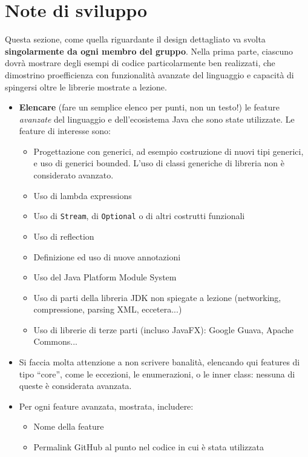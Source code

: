 \documentclass[a4paper,12pt]{report}
\begin{document}
\section{Note di sviluppo}

Questa sezione, come quella riguardante il design dettagliato va svolta \textbf{singolarmente da ogni membro del gruppo}.
%
Nella prima parte, ciascuno dovrà mostrare degli esempi di codice particolarmente ben realizzati,
che dimostrino proefficienza con funzionalità avanzate del linguaggio e capacità di spingersi oltre le librerie mostrate a lezione.

\begin{itemize}
	\item \textbf{Elencare} (fare un semplice elenco per punti, non un testo!) le feature \textit{avanzate} del linguaggio e dell'ecosistema Java che sono state
	      utilizzate. Le feature di interesse sono:
	      \begin{itemize}
		      \item Progettazione con generici, ad esempio costruzione di nuovi tipi generici, e uso di generici bounded.
		            L'uso di classi generiche di libreria non è considerato avanzato.
		      \item Uso di lambda expressions
		      \item Uso di \texttt{Stream}, di \texttt{Optional} o di altri costrutti funzionali
		      \item Uso di reflection
		      \item Definizione ed uso di nuove annotazioni
		      \item Uso del Java Platform Module System
		      \item Uso di parti della libreria JDK non spiegate a lezione (networking, compressione, parsing XML, eccetera...)
		      \item Uso di librerie di terze parti (incluso JavaFX): Google Guava, Apache Commons...
	      \end{itemize}
	\item Si faccia molta attenzione a non scrivere banalità, elencando qui features di tipo ``core'', come le eccezioni, le enumerazioni, o le inner class: nessuna di queste è considerata avanzata.
	\item Per ogni feature avanzata, mostrata, includere:
	      \begin{itemize}
		      \item Nome della feature
		      \item Permalink GitHub al punto nel codice in cui è stata utilizzata
	      \end{itemize}
\end{itemize}
\end{document}
